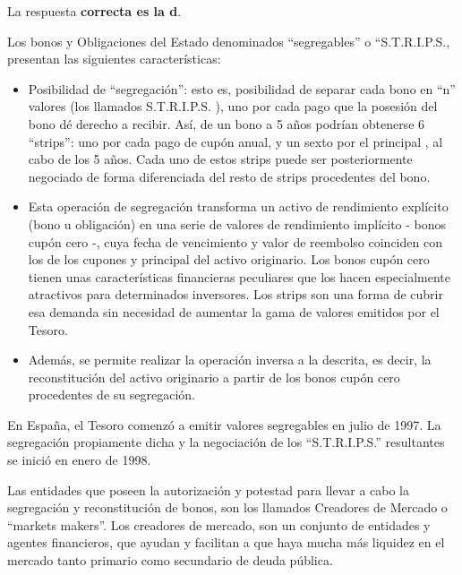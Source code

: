 \documentclass[
  letterpaper,
  DIV=11,
  numbers=noendperiod]{scrartcl}
\begin{document}
\begin{tcolorbox}[enhanced jigsaw, colframe=quarto-callout-note-color-frame, opacityback=0, colback=white, leftrule=.75mm, left=2mm, breakable, arc=.35mm, rightrule=.15mm, toprule=.15mm, bottomrule=.15mm]
\begin{minipage}[t]{5.5mm}
\textcolor{quarto-callout-note-color}{\faInfo}
\end{minipage}%
\begin{minipage}[t]{\textwidth - 5.5mm}

La respuesta \textbf{correcta es la d}.

Los bonos y Obligaciones del Estado denominados ``segregables'' o
``S.T.R.I.P.S., presentan las siguientes características:

\begin{itemize}
\item
  Posibilidad de ``segregación'': esto es, posibilidad de separar cada
  bono en ``n'' valores (los llamados S.T.R.I.P.S. ), uno por cada pago
  que la posesión del bono dé derecho a recibir. Así, de un bono a 5
  años podrían obtenerse 6 ``strips'': uno por cada pago de cupón anual,
  y un sexto por el principal , al cabo de los 5 años. Cada uno de estos
  strips puede ser posteriormente negociado de forma diferenciada del
  resto de strips procedentes del bono.
\item
  Esta operación de segregación transforma un activo de rendimiento
  explícito (bono u obligación) en una serie de valores de rendimiento
  implícito - bonos cupón cero -, cuya fecha de vencimiento y valor de
  reembolso coinciden con los de los cupones y principal del activo
  originario. Los bonos cupón cero tienen unas características
  financieras peculiares que los hacen especialmente atractivos para
  determinados inversores. Los strips son una forma de cubrir esa
  demanda sin necesidad de aumentar la gama de valores emitidos por el
  Tesoro.
\item
  Además, se permite realizar la operación inversa a la descrita, es
  decir, la reconstitución del activo originario a partir de los bonos
  cupón cero procedentes de su segregación.
\end{itemize}

En España, el Tesoro comenzó a emitir valores segregables en julio de
1997. La segregación propiamente dicha y la negociación de los
``S.T.R.I.P.S.'' resultantes se inició en enero de 1998.

Las entidades que poseen la autorización y potestad para llevar a cabo
la segregación y reconstitución de bonos, son los llamados Creadores de
Mercado o ``markets makers''. Los creadores de mercado, son un conjunto
de entidades y agentes financieros, que ayudan y facilitan a que haya
mucha más liquidez en el mercado tanto primario como secundario de deuda
pública.

\end{minipage}%
\end{tcolorbox}
\end{document}
